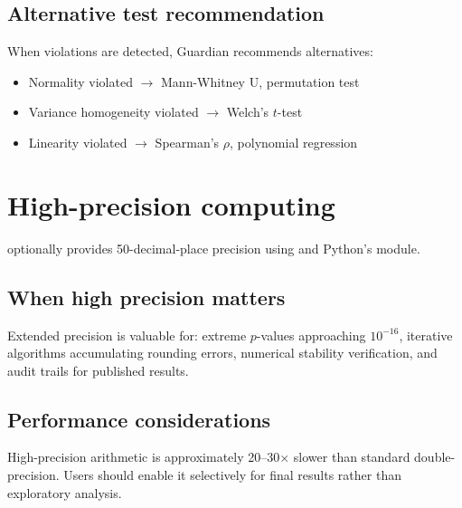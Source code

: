 \documentclass[article]{jss}
\begin{document}
\subsection{Alternative test recommendation}

When violations are detected, Guardian recommends alternatives:

\begin{itemize}
\item Normality violated $\rightarrow$ Mann-Whitney U, permutation test
\item Variance homogeneity violated $\rightarrow$ Welch's $t$-test
\item Linearity violated $\rightarrow$ Spearman's $\rho$, polynomial regression
\end{itemize}


\section{High-precision computing} \label{sec:precision}


 optionally provides 50-decimal-place precision using  \citep{johansson2013mpmath} and Python's  module.

\subsection{When high precision matters}

Extended precision is valuable for: extreme $p$-values approaching $10^{-16}$, iterative algorithms accumulating rounding errors, numerical stability verification, and audit trails for published results.

\subsection{Performance considerations}

High-precision arithmetic is approximately 20--30$\times$ slower than standard double-precision. Users should enable it selectively for final results rather than exploratory analysis.

\end{document}
